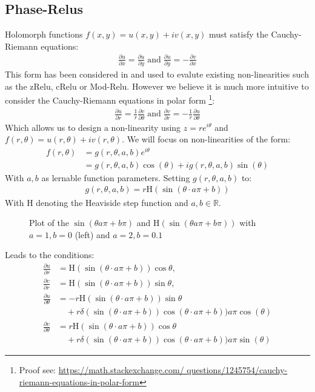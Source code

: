 \documentclass{article}
\begin{document}
\subsection{Phase-Relus}
Holomorph functions $f(x,y) = u(x,y) + iv(x,y)$ must satisfy the Cauchy-Riemann equations:
\begin{align}
\frac{\partial u}{\partial x} = \frac{\partial u}{\partial y} \; \text{and} \; \frac{\partial u}{\partial y} = -\frac{\partial v}{\partial x}  
\end{align}
This form has been considered in \cite{Trabelsi} and used to evalute existing non-linearities such as the zRelu, cRelu or Mod-Relu. However we believe it is much more intuitive to consider the Cauchy-Riemann equations in polar form \footnote{Proof see: \url{https://math.stackexchange.com/
questions/1245754/cauchy-riemann-equations-in-polar-form}}:
\begin{align}
\frac{\partial u}{\partial r} = \frac{1}{r} \frac{\partial v}{\partial \theta} \; \text{and} \; \frac{\partial v}{\partial r} = - \frac{1}{r} \frac{\partial u}{\partial \theta}
\end{align}
Which allows us to design a non-linearity using $z = re^{i\theta}$ and $f(r,\theta ) = u(r,\theta ) + iv(r,\theta )$. We will focus on non-linearities of the form:
\begin{align}
f(r, \theta) &= g(r,\theta,a,b) e^{i \theta} \\
&= g(r,\theta,a,b)\cos(\theta) + ig(r,\theta,a,b)\sin(\theta)
\end{align}
With $a,b$ as lernable function parameters. Setting $g(r,\theta,a,b)$ to:
\begin{align}
g(r,\theta,a,b) = r \text{H}(\sin (\theta \cdot a\pi + b))
\label{eq:PhaseRelu}
\end{align}
With H denoting the Heaviside step function and $a,b \in \mathbb{R}$.
\begin{figure}
    \centering
    
    
    \caption{Plot of the $\sin(\theta a\pi + b\pi)$ and $\text{H}(\sin(\theta a\pi + b\pi))$ with $a=1, b=0$ (left) and $a=2, b=0.1$}
    \label{fig:step_sine}
\end{figure}
Leads to the conditions:
\begin{align}
\frac{\partial u}{\partial r} &= \text{H}(\sin (\theta \cdot a\pi + b)) \cos \theta, \\ 
\frac{\partial v}{\partial r} &= \text{H}(\sin (\theta \cdot a\pi + b)) \sin \theta, \\
\frac{\partial u}{\partial \theta} &= -r \text{H}(\sin (\theta \cdot a\pi + b)) \sin \theta \nonumber \\
&\quad + r \delta(\sin (\theta \cdot a\pi + b)) \cos(\theta \cdot a\pi + b))a\pi \cos(\theta)\\ 
\frac{\partial v}{\partial \theta} &= r \text{H}(\sin (\theta \cdot a\pi + b)) \cos \theta \nonumber \\
&\quad + r \delta(\sin (\theta \cdot a\pi + b)) \cos(\theta \cdot a\pi + b))a\pi \sin(\theta)
\end{align}
\end{document}
